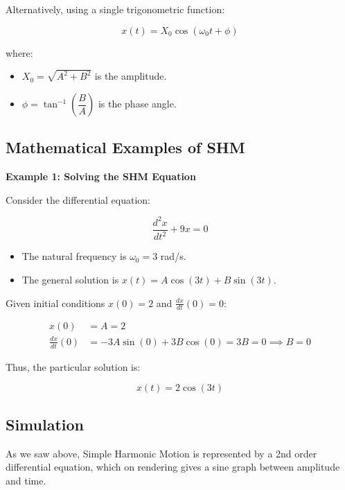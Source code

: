 \documentclass[12pt,a4paper]{article}
\begin{document}
Alternatively, using a single trigonometric function:

\[
x(t) = X_0 \cos(\omega_0 t + \phi)
\]

where:

\begin{itemize}
    \item \( X_0 = \sqrt{A^2 + B^2} \) is the amplitude.
    \item \( \phi = \tan^{-1}\left( \dfrac{B}{A} \right) \) is the phase angle.
\end{itemize}

\subsection{Mathematical Examples of SHM}

\textbf{Example 1: Solving the SHM Equation}

Consider the differential equation:

\[
\frac{d^2 x}{dt^2} + 9 x = 0
\]

\begin{itemize}
    \item The natural frequency is \( \omega_0 = 3 \) rad/s.
    \item The general solution is \( x(t) = A \cos(3 t) + B \sin(3 t) \).
\end{itemize}

Given initial conditions \( x(0) = 2 \) and \( \frac{dx}{dt}(0) = 0 \):

\begin{align*}
x(0) &= A = 2 \\
\frac{dx}{dt}(0) &= -3 A \sin(0) + 3 B \cos(0) = 3 B = 0 \implies B = 0
\end{align*}

Thus, the particular solution is:

\[
x(t) = 2 \cos(3 t)
\]

\subsection{Simulation}

As we saw above, Simple Harmonic Motion is represented by a 2nd order differential equation, which on rendering gives a sine graph between amplitude and time.\\
\end{document}
